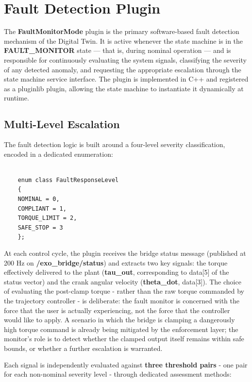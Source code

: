 \section{Fault Detection Plugin}
The \textbf{FaultMonitorMode} plugin is the primary software-based fault detection mechanism of the Digital Twin. It is active whenever the state machine is in the \textbf{FAULT\_MONITOR} state — that is, during nominal operation — and is responsible for continuously evaluating the system signals, classifying the severity of any detected anomaly, and requesting the appropriate escalation through the state machine service interface. The plugin is implemented in C++ and registered as a pluginlib plugin, allowing the state machine to instantiate it dynamically at runtime.

\subsection{Multi-Level Escalation}
The fault detection logic is built around a four-level severity classification, encoded in a dedicated enumeration:

\begin{verbatim}

    enum class FaultResponseLevel
    {
    NOMINAL = 0,
    COMPLIANT = 1,
    TORQUE_LIMIT = 2,
    SAFE_STOP = 3
    };

\end{verbatim}

At each control cycle, the plugin receives the bridge status message (published at 200 Hz on \textbf{/exo\_bridge/status}) and extracts two key signals: the torque effectively delivered to the plant (\textbf{tau\_out}, corresponding to data[5] of the status vector) and the crank angular velocity (\textbf{theta\_dot}, data[3]). The choice of evaluating the post-clamp torque - rather than the raw torque commanded by the trajectory controller - is deliberate: the fault monitor is concerned with the force that the user is actually experiencing, not the force that the controller would like to apply. A scenario in which the bridge is clamping a dangerously high torque command is already being mitigated by the enforcement layer; the monitor's role is to detect whether the clamped output itself remains within safe bounds, or whether a further escalation is warranted.

Each signal is independently evaluated against \textbf{three threshold pairs} - one pair for each non-nominal severity level - through dedicated assessment methods:

